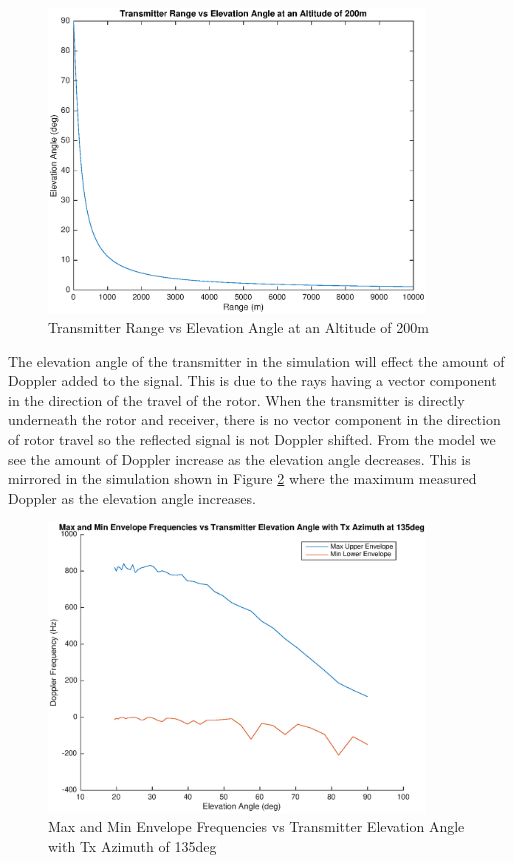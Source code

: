  \begin{figure}
	\begin{center}
		\includegraphics[width=10cm]{images/simulation/range_elevation_rel.eps}
		\caption{Transmitter Range vs Elevation Angle at an Altitude of 200m}
		\label{fig:tx_range_elevation_rel}
	\end{center}
\end{figure}

The elevation angle of the transmitter in the simulation will effect the amount of Doppler added to the signal. This is due to the rays having a vector component in the direction of the travel of the rotor. When the transmitter is directly underneath the rotor and receiver, there is no vector component in the direction of rotor travel so the reflected signal is not Doppler shifted. From the model we see the amount of Doppler increase as the elevation angle decreases. This is mirrored in the simulation shown in Figure \ref{fig:tx_elevation_135deg} where the maximum measured Doppler as the elevation angle increases.

 \begin{figure}
	\begin{center}
		\includegraphics[width=10cm]{images/simulation/elevation_angle_max_doppler_135deg.eps}
		\caption{Max and Min Envelope Frequencies vs Transmitter Elevation Angle with Tx Azimuth of 135deg}
		\label{fig:tx_elevation_135deg}
	\end{center}
\end{figure}

